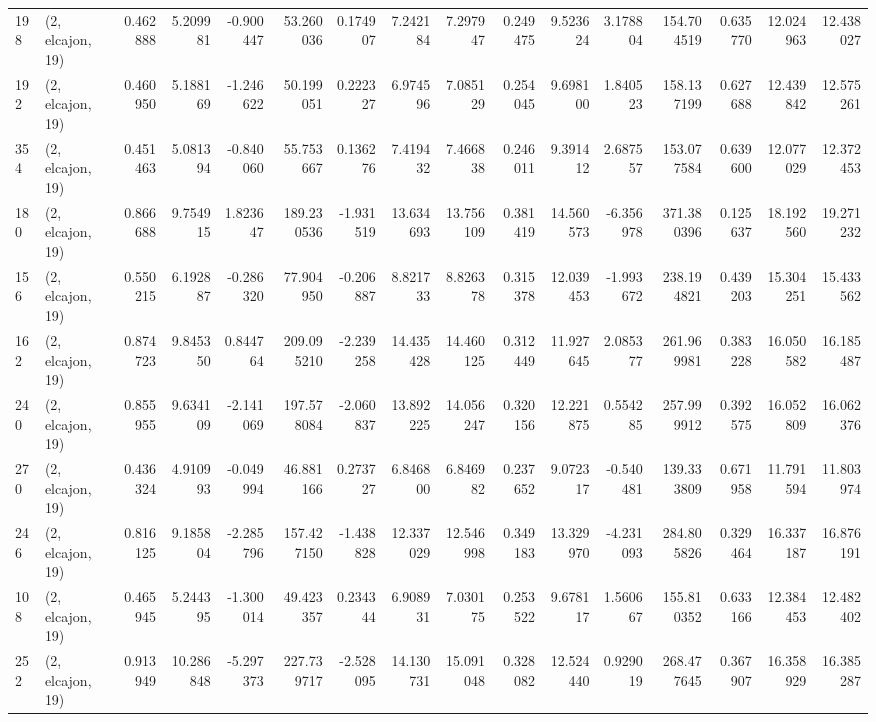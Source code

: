 \begin{tabular}{llrrrrrrrrrrrrrr}
198 &  (2, elcajon, 19) &   0.462888 &   5.209981 &  -0.900447 &    53.260036 &   0.174907 &   7.242184 &   7.297947 &  0.249475 &   9.523624 &   3.178804 &    154.704519 &    0.635770 &   12.024963 &   12.438027 \\
192 &  (2, elcajon, 19) &   0.460950 &   5.188169 &  -1.246622 &    50.199051 &   0.222327 &   6.974596 &   7.085129 &  0.254045 &   9.698100 &   1.840523 &    158.137199 &    0.627688 &   12.439842 &   12.575261 \\
354 &  (2, elcajon, 19) &   0.451463 &   5.081394 &  -0.840060 &    55.753667 &   0.136276 &   7.419432 &   7.466838 &  0.246011 &   9.391412 &   2.687557 &    153.077584 &    0.639600 &   12.077029 &   12.372453 \\
180 &  (2, elcajon, 19) &   0.866688 &   9.754915 &   1.823647 &   189.230536 &  -1.931519 &  13.634693 &  13.756109 &  0.381419 &  14.560573 &  -6.356978 &    371.380396 &    0.125637 &   18.192560 &   19.271232 \\
156 &  (2, elcajon, 19) &   0.550215 &   6.192887 &  -0.286320 &    77.904950 &  -0.206887 &   8.821733 &   8.826378 &  0.315378 &  12.039453 &  -1.993672 &    238.194821 &    0.439203 &   15.304251 &   15.433562 \\
162 &  (2, elcajon, 19) &   0.874723 &   9.845350 &   0.844764 &   209.095210 &  -2.239258 &  14.435428 &  14.460125 &  0.312449 &  11.927645 &   2.085377 &    261.969981 &    0.383228 &   16.050582 &   16.185487 \\
240 &  (2, elcajon, 19) &   0.855955 &   9.634109 &  -2.141069 &   197.578084 &  -2.060837 &  13.892225 &  14.056247 &  0.320156 &  12.221875 &   0.554285 &    257.999912 &    0.392575 &   16.052809 &   16.062376 \\
270 &  (2, elcajon, 19) &   0.436324 &   4.910993 &  -0.049994 &    46.881166 &   0.273727 &   6.846800 &   6.846982 &  0.237652 &   9.072317 &  -0.540481 &    139.333809 &    0.671958 &   11.791594 &   11.803974 \\
246 &  (2, elcajon, 19) &   0.816125 &   9.185804 &  -2.285796 &   157.427150 &  -1.438828 &  12.337029 &  12.546998 &  0.349183 &  13.329970 &  -4.231093 &    284.805826 &    0.329464 &   16.337187 &   16.876191 \\
108 &  (2, elcajon, 19) &   0.465945 &   5.244395 &  -1.300014 &    49.423357 &   0.234344 &   6.908931 &   7.030175 &  0.253522 &   9.678117 &   1.560667 &    155.810352 &    0.633166 &   12.384453 &   12.482402 \\
252 &  (2, elcajon, 19) &   0.913949 &  10.286848 &  -5.297373 &   227.739717 &  -2.528095 &  14.130731 &  15.091048 &  0.328082 &  12.524440 &   0.929019 &    268.477645 &    0.367907 &   16.358929 &   16.385287 \\

\end{tabular}
